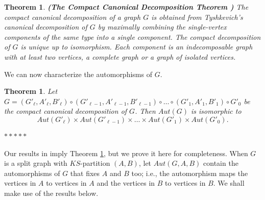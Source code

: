 \documentclass[11pt]{article}
\newtheorem{theorem}[df]{Theorem}
\begin{document}


\medskip

\begin{theorem}
 \label{canon2}
{\bf (The Compact Canonical Decomposition Theorem  \cite{Ch25})}   The compact canonical decomposition of a graph $G$ is obtained from Tyshkevich's canonical decomposition of $G$ by maximally combining the single-vertex components of the same type into a single component.  The compact decomposition of $G$ is unique up to isomorphism. Each component is an indecomposable graph with at least two vertices, a complete graph or a graph of isolated vertices.
\end{theorem}

We can now  characterize the automorphisms of $G$. 
\medskip

\begin{theorem}
Let $G= (G'_\ell , A'_\ell, B'_\ell) \circ (G'_{\ell-1}, A'_{\ell-1}, B'_{\ell-1})  \circ \hdots \circ (G'_1, A'_1, B'_1) \circ G'_0$ be the compact canonical decomposition of $G$.  Then $Aut(G)$ is isomorphic to 
$$ Aut(G'_\ell) \times Aut(G'_{\ell-1})   \times \hdots \times Aut(G'_1) \times Aut(G'_0).$$
\label{thmautomorph}
\end{theorem}


\centerline{$*  *  *  * *$}
\bigskip %
\medskip


Our results in \cite{Ch25} imply Theorem \ref{thmautomorph},  but we prove it here for completeness.  When $G$ is a split graph with $KS$-partition $(A,B)$, let $Aut(G,A,B)$ contain the automorphisms of $G$ that fixes $A$ and $B$ too; i.e., the automorphism maps the vertices in $A$ to vertices in $A$ and the vertices in $B$ to vertices in $B$.  
We shall make use of the results below.  %
\end{document}
